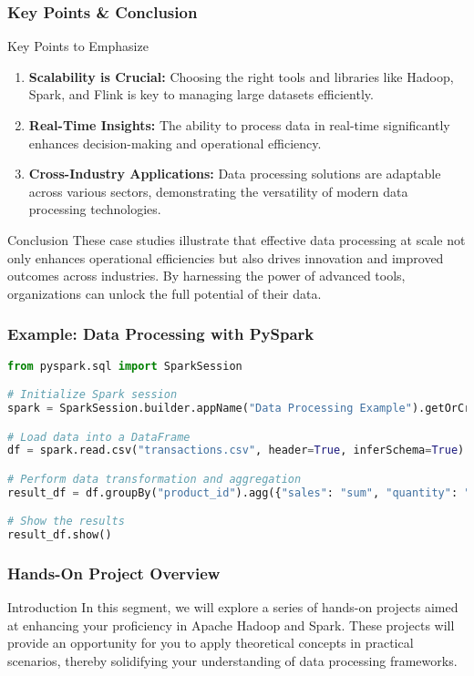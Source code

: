 \documentclass[aspectratio=169]{beamer}
\begin{document}
\begin{frame}[fragile]
    \frametitle{Key Points & Conclusion}
    \begin{block}{Key Points to Emphasize}
        \begin{enumerate}
            \item \textbf{Scalability is Crucial:} Choosing the right tools and libraries like Hadoop, Spark, and Flink is key to managing large datasets efficiently.
            \item \textbf{Real-Time Insights:} The ability to process data in real-time significantly enhances decision-making and operational efficiency.
            \item \textbf{Cross-Industry Applications:} Data processing solutions are adaptable across various sectors, demonstrating the versatility of modern data processing technologies.
        \end{enumerate}
    \end{block}

    \begin{block}{Conclusion}
        These case studies illustrate that effective data processing at scale not only enhances operational efficiencies but also drives innovation and improved outcomes across industries. By harnessing the power of advanced tools, organizations can unlock the full potential of their data.
    \end{block}
\end{frame}

\begin{frame}[fragile]
    \frametitle{Example: Data Processing with PySpark}
    \begin{lstlisting}[language=Python]
from pyspark.sql import SparkSession

# Initialize Spark session
spark = SparkSession.builder.appName("Data Processing Example").getOrCreate()

# Load data into a DataFrame
df = spark.read.csv("transactions.csv", header=True, inferSchema=True)

# Perform data transformation and aggregation
result_df = df.groupBy("product_id").agg({"sales": "sum", "quantity": "avg"})

# Show the results
result_df.show()
    \end{lstlisting}
\end{frame}

\begin{frame}[fragile]
    \frametitle{Hands-On Project Overview}
    \begin{block}{Introduction}
        In this segment, we will explore a series of hands-on projects aimed at enhancing your proficiency in Apache Hadoop and Spark. These projects will provide an opportunity for you to apply theoretical concepts in practical scenarios, thereby solidifying your understanding of data processing frameworks.
    \end{block}
\end{frame}
\end{document}
